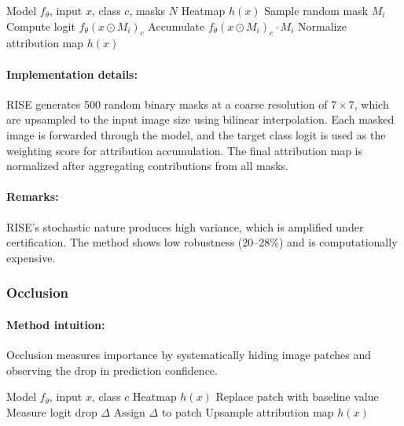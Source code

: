 \documentclass[11pt]{article}
\begin{document}
\begin{algorithm}[H]
\caption{RISE}
\label{alg:rise}
\begin{algorithmic}[1]
\REQUIRE Model $f_\theta$, input $x$, class $c$, masks $N$
\ENSURE Heatmap $h(x)$
    \STATE Sample random mask $M_i$
    \STATE Compute logit $f_\theta(x \odot M_i)_c$
    \STATE Accumulate $f_\theta(x \odot M_i)_c \cdot M_i$
\ENDFOR
\STATE Normalize attribution map
\RETURN $h(x)$
\end{algorithmic}
\end{algorithm}

\paragraph{Implementation details:}
RISE generates 500 random binary masks at a coarse resolution of $7 \times 7$, which are upsampled to the input image size using bilinear interpolation. Each masked image is forwarded through the model, and the target class logit is used as the weighting score for attribution accumulation. The final attribution map is normalized after aggregating contributions from all masks.

\paragraph{Remarks:}
RISE's stochastic nature produces high variance, which is amplified under certification. The method shows low robustness (20--28\%) and is computationally expensive.

\subsubsection{Occlusion}

\paragraph{Method intuition:}
Occlusion measures importance by systematically hiding image patches and observing the drop in prediction confidence.

\begin{algorithm}[H]
\caption{Occlusion}
\label{alg:occlusion}
\begin{algorithmic}[1]
\REQUIRE Model $f_\theta$, input $x$, class $c$
\ENSURE Heatmap $h(x)$
    \STATE Replace patch with baseline value
    \STATE Measure logit drop $\Delta$
    \STATE Assign $\Delta$ to patch
\ENDFOR
\STATE Upsample attribution map
\RETURN $h(x)$
\end{algorithmic}
\end{algorithm}
\end{document}
